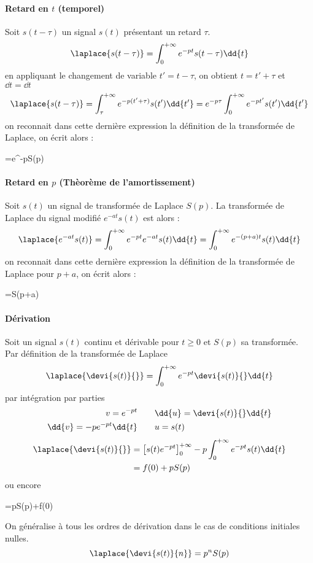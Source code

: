 \paragraph{Retard en $t$ (temporel)}
Soit $s(t-\tau)$ un signal $s(t)$ présentant un retard $\tau$.
$$
\laplace{s(t-\tau)}=\int_{0}^{+\infty} e^{-pt}s(t-\tau)\dd{t}
$$
en appliquant le changement de variable $t'=t-\tau$, on obtient $t=t'+\tau$ et $\dd{t}=\dd{t}$
$$
\laplace{s(t-\tau)}=\int_{\tau}^{+\infty} e^{-p(t'+\tau)}s(t')\dd{t'}=e^{-p\tau}\int_{0}^{+\infty} e^{-pt'}s(t')\dd{t'}
$$
on reconnait dans cette dernière expression la définition de la transformée de Laplace, on écrit alors :
\begin{bequation}
    =e^{-p\tau}S(p)
\end{bequation}
\paragraph{Retard en $p$ (Thèorème de l'amortissement)}
Soit $s(t)$ un signal de transformée de Laplace $S(p)$. La transformée 
de Laplace du signal modifié $e^{-at}s(t)$ est alors :
$$
\laplace{e^{-at}s(t)}=\int_{0}^{+\infty} e^{-pt}e^{-at}s(t)\dd{t}=\int_{0}^{+\infty} e^{-(p+a)t}s(t)\dd{t}
$$
on reconnait dans cette dernière expression la définition de la transformée de Laplace pour $p+a$,
 on écrit alors :
\begin{bequation}
    =S(p+a)
\end{bequation}
\paragraph{Dérivation}
Soit un signal $s(t)$ continu et dérivable pour $t\ge0$ et $S(p)$ sa transformée.
Par définition de la transformée de Laplace 
$$
\laplace{\devi{s(t)}{}}=\int_{0}^{+\infty} e^{-pt}\devi{s(t)}{}\dd{t}
$$
par intégration par parties
\begin{align*}
    v=e^{-pt}\qquad&\dd{u}=\devi{s(t)}{}\dd{t}\\
    \dd{v}=-pe^{-pt}\dd{t}\qquad&u=s(t)
\end{align*}
\begin{align*}
    \laplace{\devi{s(t)}{}}&=\left[s(t)e^{-pt}\right]_0^{+\infty}-p\int_{0}^{+\infty} e^{-pt}s(t)\dd{t} \\
                           &=f(0)+pS(p)
\end{align*}
ou encore
\begin{bequation}
    =pS(p)+f(0)
\end{bequation}
On généralise à tous les ordres de dérivation dans le cas de conditions initiales nulles.
$$
\laplace{\devi{s(t)}{n}}=p^nS(p)
$$

